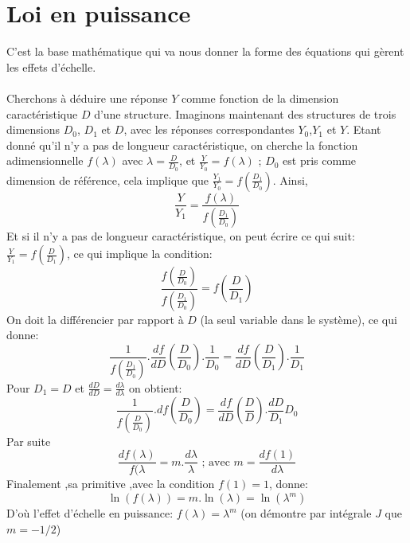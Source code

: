 \documentclass{DGC_M2_report}
\begin{document}
\section{Loi en puissance}
C'est la base mathématique qui va nous donner la forme des équations qui gèrent les effets d'échelle.\\\\   
Cherchons à déduire une réponse $Y$ comme fonction de la dimension
caractéristique $D$ d'une structure. Imaginons maintenant des structures de trois dimensions $D_0$, $D_1$ et $D$, avec les réponses correspondantes $Y_0$,$Y_1$ et $Y$. Etant donné qu'il n'y a pas de longueur
caractéristique, on cherche la fonction adimensionnelle $f(\lambda)$ avec $\lambda = \frac{D}{D_0}$, et $\frac{Y}{Y_0} = f(\lambda)$ ; $D_0$ est pris comme dimension de référence, cela implique que $\frac{Y_1}{Y_0} = f(\frac{D_1}{D_0})$.
Ainsi, \[\frac{Y}{Y_1} = \frac{f(\lambda)}{f(\frac{D_1}{D_0})}\]
Et si il n'y a pas de longueur caractéristique, on peut écrire ce qui suit: $\frac{Y}{Y_1} = f(\frac{D}{D_1})$, ce qui implique la condition:
\[\frac{f(\frac{D}{D_0})}{f(\frac{D_1}{D_0})} = f(\frac{D}{D_1})\]
On doit la différencier par rapport à $D$ (la seul variable dans le système), ce qui donne:\[\frac{1}{f(\frac{D_1}{D_0})}.\frac{df}{dD}(\frac{D}{D_0}).\frac{1}{D_0} = \frac{df}{dD}(\frac{D}{D_1}).\frac{1}{D_1}\]
Pour $D_1 = D$ et $\frac{dD}{dD} = \frac{d\lambda}{d\lambda}$ on obtient:
\[\frac{1}{f(\frac{D}{D_0})}.df(\frac{D}{D_0}) = \frac{df}{dD}(\frac{D}{D}).\frac{dD}{D_1}D_0\]
Par suite \[\frac{df(\lambda)}{f(\lambda} = m.\frac{d\lambda}{\lambda}\text{  ; avec  }m = \frac{df(1)}{d\lambda}\]
Finalement ,sa primitive ,avec la condition $f(1) = 1$, donne: \[\ln(f(\lambda)) = m.\ln(\lambda) = \ln(\lambda^m)\]
D'où l'effet d'échelle en puissance: $f(\lambda) = \lambda^m$ (on démontre par intégrale $J$ que $m = -1/2$)
\end{document}
